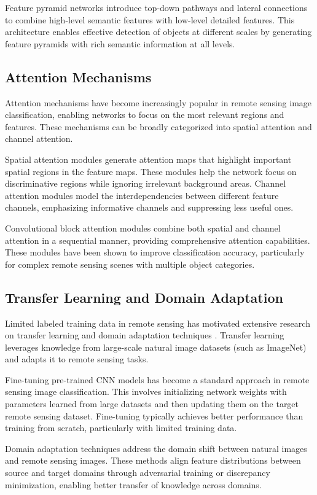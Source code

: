 \documentclass[12pt,a4paper]{article}
\begin{document}
Feature pyramid networks introduce top-down pathways and lateral connections to combine high-level semantic features with low-level detailed features. This architecture enables effective detection of objects at different scales by generating feature pyramids with rich semantic information at all levels.

\subsection{Attention Mechanisms}
Attention mechanisms have become increasingly popular in remote sensing image classification, enabling networks to focus on the most relevant regions and features. These mechanisms can be broadly categorized into spatial attention and channel attention.

Spatial attention modules generate attention maps that highlight important spatial regions in the feature maps. These modules help the network focus on discriminative regions while ignoring irrelevant background areas. Channel attention modules model the interdependencies between different feature channels, emphasizing informative channels and suppressing less useful ones.

Convolutional block attention modules combine both spatial and channel attention in a sequential manner, providing comprehensive attention capabilities. These modules have been shown to improve classification accuracy, particularly for complex remote sensing scenes with multiple object categories.

\subsection{Transfer Learning and Domain Adaptation}
Limited labeled training data in remote sensing has motivated extensive research on transfer learning and domain adaptation techniques \cite{zhu2017deep}. Transfer learning leverages knowledge from large-scale natural image datasets (such as ImageNet) and adapts it to remote sensing tasks.

Fine-tuning pre-trained CNN models has become a standard approach in remote sensing image classification. This involves initializing network weights with parameters learned from large datasets and then updating them on the target remote sensing dataset. Fine-tuning typically achieves better performance than training from scratch, particularly with limited training data.

Domain adaptation techniques address the domain shift between natural images and remote sensing images. These methods align feature distributions between source and target domains through adversarial training or discrepancy minimization, enabling better transfer of knowledge across domains.
\end{document}
